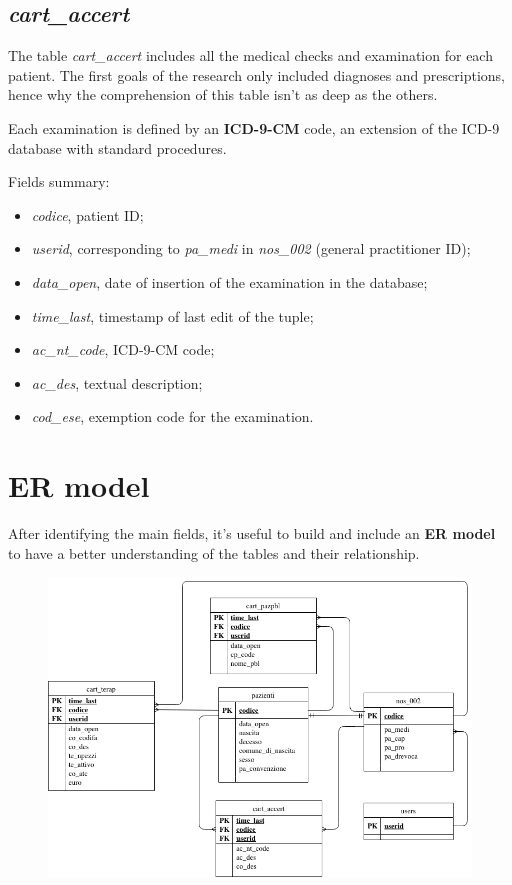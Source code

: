 \subsection{\textit{cart\_accert}} %
The table \textit{cart\_accert} includes all the medical checks and examination for each patient. The first goals of the research only included diagnoses and prescriptions, hence why the comprehension of this table isn't as deep as the others.

Each examination is defined by an \textbf{ICD-9-CM} code, an extension of the ICD-9 database with standard procedures. 

Fields summary:
\begin{itemize}
	\item \textit{codice}, patient ID;
	\item \textit{userid}, corresponding to \textit{pa\_medi} in \textit{nos\_002} (general practitioner ID);
	\item \textit{data\_open}, date of insertion of the examination in the database;
	\item \textit{time\_last}, timestamp of last edit of the tuple;
	\item \textit{ac\_nt\_code}, ICD-9-CM code;
	\item \textit{ac\_des}, textual description;
	\item \textit{cod\_ese}, exemption code for the examination.
\end{itemize}

\section{ER model}
After identifying the main fields, it's useful to build and include an \textbf{ER model}\cite{draw} to have a better understanding of the tables and their relationship.
\begin{figure}[h]
	\centering
	\includegraphics[scale=0.6]{images/er.png}
\end{figure}

